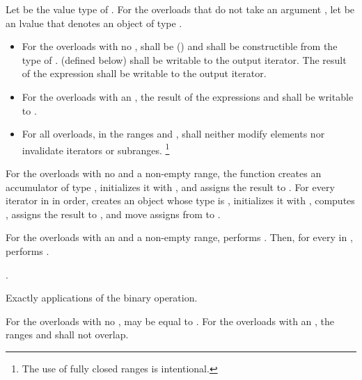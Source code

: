 \begin{itemdescr}
\pnum
Let  be the value type of .
For the overloads that do not take an argument ,
let  be an lvalue
that denotes an object of type .

\pnum
\requires
\begin{itemize}
\item
  For the overloads with no ,
   shall be  () and
  shall be constructible from the type of .
   (defined below) shall be
  writable
  to the  output iterator.
  The result of the expression 
  shall be writable to the  output iterator.
\item
  For the overloads with an ,
  the result of the expressions  and
   shall be writable to .
\item
  For all overloads, in the ranges 
  and ,
   shall neither modify elements
  nor invalidate iterators or subranges.%
  \footnote{The use of fully closed ranges is intentional.}
\end{itemize}

\pnum
\effects
For the overloads with no  and a non-empty range,
the function creates an accumulator  of type ,
initializes it with ,
and assigns the result to .
For every iterator  in  in order,
creates an object  whose type is ,
initializes it with ,
computes ,
assigns the result to , and
move assigns from  to .

\pnum
For the overloads with an  and a non-empty range,
performs .
Then, for every  in ,
performs .

\pnum
\returns
{}.

\pnum
\complexity
Exactly  applications of the binary operation.

\pnum
\remarks
For the overloads with no ,
 may be equal to .
For the overloads with an ,
the ranges  and 
shall not overlap.
\end{itemdescr}

